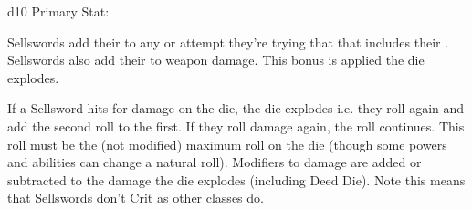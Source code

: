 {  





  \HD d10 \hfill Primary Stat: \VIG
  


  
  Sellswords add their \LVL to any \RO or \RB attempt they're trying that that includes their \VIG.  Sellswords also add their \LVL to weapon damage.  This bonus is applied   the die explodes.

  \cbreak


  If a Sellsword hits for \MAX damage on the die, the die explodes i.e. they roll again and add the second roll to the first.  If they roll \MAX damage again, the roll continues.  This roll must be the  (not modified) maximum roll on the die (though some powers and abilities can change a natural roll).  Modifiers to damage are added or subtracted to the damage   the die explodes (including Deed Die).  Note this means that Sellswords don't Crit as other classes do.

}
